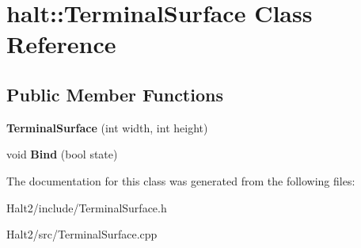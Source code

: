 \hypertarget{classhalt_1_1_terminal_surface}{\section{halt\-:\-:\-Terminal\-Surface \-Class \-Reference}
\label{classhalt_1_1_terminal_surface}
}
\subsection*{\-Public \-Member \-Functions}
\begin{DoxyCompactItemize}
\item 
\hypertarget{classhalt_1_1_terminal_surface_acd9b47b321c2dc3a1ae20c052d285098}{{\bfseries \-Terminal\-Surface} (int width, int height)}\label{classhalt_1_1_terminal_surface_acd9b47b321c2dc3a1ae20c052d285098}

\item 
\hypertarget{classhalt_1_1_terminal_surface_ad46d8e11bff78ffa7f6fc4d7c1d0ba05}{void {\bfseries \-Bind} (bool state)}\label{classhalt_1_1_terminal_surface_ad46d8e11bff78ffa7f6fc4d7c1d0ba05}

\end{DoxyCompactItemize}


\-The documentation for this class was generated from the following files\-:\begin{DoxyCompactItemize}
\item 
\-Halt2/include/\-Terminal\-Surface.\-h\item 
\-Halt2/src/\-Terminal\-Surface.\-cpp\end{DoxyCompactItemize}
